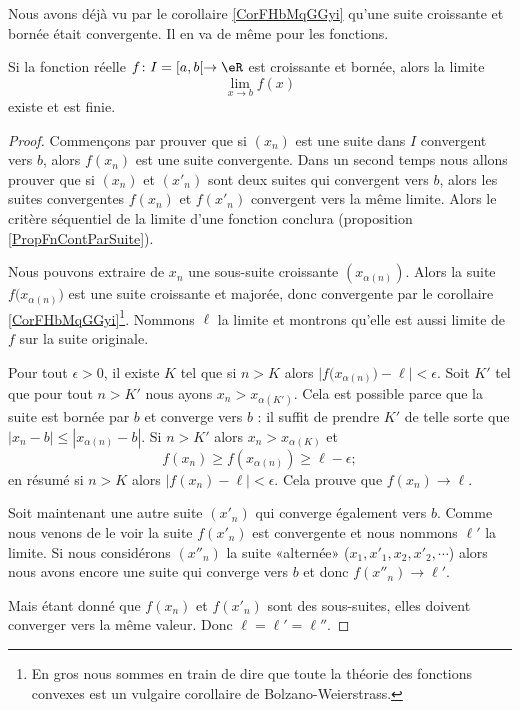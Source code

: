 Nous avons déjà vu par le corollaire \ref{CorFHbMqGGyi} qu'une suite croissante et bornée était convergente. Il en va de même pour les fonctions.
\begin{proposition} \label{PropMTmBYeU}
    Si la fonction réelle \( f\colon I=\mathopen[ a , b [\to \eR\) est croissante et bornée, alors la limite
    \begin{equation}
        \lim_{x\to b} f(x)
    \end{equation}
    existe et est finie.
\end{proposition}

\begin{proof}

    Commençons par prouver que si \( (x_n)\) est une suite dans \( I\) convergent vers \( b\), alors \( f(x_n)\) est une suite convergente. Dans un second temps nous allons prouver que si \( (x_n)\) et \( (x'_n)\) sont deux suites qui convergent vers \( b\), alors les suites convergentes \( f(x_n)\) et \( f(x'_n)\) convergent vers la même limite. Alors le critère séquentiel de la limite d'une fonction conclura (proposition \ref{PropFnContParSuite}).

    Nous pouvons extraire de \( x_n\) une sous-suite croissante \( (x_{\alpha(n)})\). Alors la suite \( f\big( x_{\alpha(n)} \big)\) est une suite croissante et majorée, donc convergente par le corollaire \ref{CorFHbMqGGyi}\footnote{En gros nous sommes en train de dire que toute la théorie des fonctions convexes est un vulgaire corollaire de Bolzano-Weierstrass.}. Nommons \( \ell\) la limite et montrons qu'elle est aussi limite de \( f\) sur la suite originale.

    Pour tout \( \epsilon>0\), il existe \( K\) tel que si \( n>K\) alors \( \big| f\big( x_{\alpha(n)} \big)-\ell \big|<\epsilon\). Soit \( K'\) tel que pour tout \( n>K'\) nous ayons \( x_n>x_{\alpha(K')}\). Cela est possible parce que la suite est bornée par \( b\) et converge vers \( b\) : il suffit de prendre \( K'\) de telle sorte que \( | x_n-b |\leq | x_{\alpha(n)}-b |\). Si \( n>K'\) alors \( x_n>x_{\alpha(K)}\) et
    \begin{equation}
        f(x_n)\geq f(x_{\alpha(n)})\geq \ell-\epsilon;
    \end{equation}
    en résumé si \( n>K\) alors \( | f(x_n)-\ell |<\epsilon\). Cela prouve que \( f(x_n)\to\ell\).

    Soit maintenant une autre suite \( (x'_n)\) qui converge également vers \( b\). Comme nous venons de le voir la suite \( f(x'_n)\) est convergente et nous nommons \( \ell'\) la limite. Si nous considérons \( (x''_n)\) la suite «alternée» (\( x_1,x'_1,x_2,x'_2,\cdots\)) alors nous avons encore une suite qui converge vers \( b\) et donc \( f(x''_n)\to \ell'\).

    Mais étant donné que \( f(x_n)\) et \( f(x'_n)\) sont des sous-suites, elles doivent converger vers la même valeur. Donc \( \ell=\ell'=\ell''\).
\end{proof}

